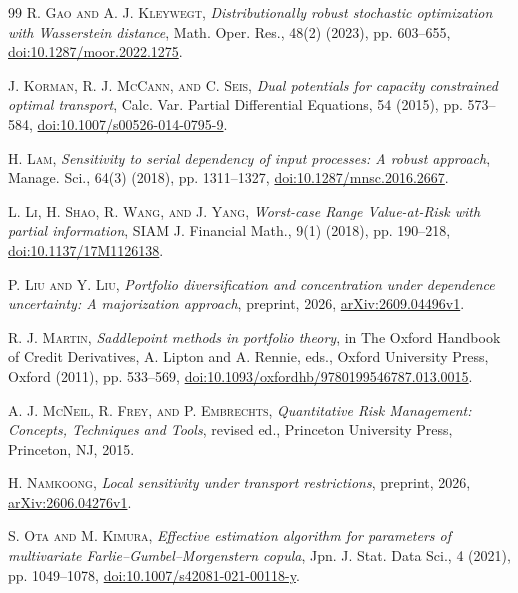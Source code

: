 \begin{thebibliography}{99}
\textsc{R. Gao and A. J. Kleywegt}, \emph{Distributionally robust stochastic optimization with Wasserstein distance}, Math. Oper. Res., 48(2) (2023), pp. 603--655, \href{https://doi.org/10.1287/moor.2022.1275}{doi:10.1287/moor.2022.1275}.

\textsc{J. Korman, R. J. McCann, and C. Seis}, \emph{Dual potentials for capacity constrained optimal transport}, Calc. Var. Partial Differential Equations, 54 (2015), pp. 573--584, \href{https://doi.org/10.1007/s00526-014-0795-9}{doi:10.1007/s00526-014-0795-9}.

\textsc{H. Lam}, \emph{Sensitivity to serial dependency of input processes: A robust approach}, Manage. Sci., 64(3) (2018), pp. 1311--1327, \href{https://doi.org/10.1287/mnsc.2016.2667}{doi:10.1287/mnsc.2016.2667}.

\textsc{L. Li, H. Shao, R. Wang, and J. Yang}, \emph{Worst-case Range Value-at-Risk with partial information}, SIAM J. Financial Math., 9(1) (2018), pp. 190--218, \href{https://doi.org/10.1137/17M1126138}{doi:10.1137/17M1126138}.

\textsc{P. Liu and Y. Liu}, \emph{Portfolio diversification and concentration under dependence uncertainty: A majorization approach}, preprint, 2026, \href{https://arxiv.org/abs/2609.04496v1}{arXiv:2609.04496v1}.

\textsc{R. J. Martin}, \emph{Saddlepoint methods in portfolio theory}, in The Oxford Handbook of Credit Derivatives, A. Lipton and A. Rennie, eds., Oxford University Press, Oxford (2011), pp. 533--569, \href{https://doi.org/10.1093/oxfordhb/9780199546787.013.0015}{doi:10.1093/oxfordhb/9780199546787.013.0015}.

\textsc{A. J. McNeil, R. Frey, and P. Embrechts}, \emph{Quantitative Risk Management: Concepts, Techniques and Tools}, revised ed., Princeton University Press, Princeton, NJ, 2015.

\textsc{H. Namkoong}, \emph{Local sensitivity under transport restrictions}, preprint, 2026, \href{https://arxiv.org/abs/2606.04276v1}{arXiv:2606.04276v1}.

\textsc{S. Ota and M. Kimura}, \emph{Effective estimation algorithm for parameters of multivariate Farlie--Gumbel--Morgenstern copula}, Jpn. J. Stat. Data Sci., 4 (2021), pp. 1049--1078, \href{https://doi.org/10.1007/s42081-021-00118-y}{doi:10.1007/s42081-021-00118-y}.


\end{thebibliography}
